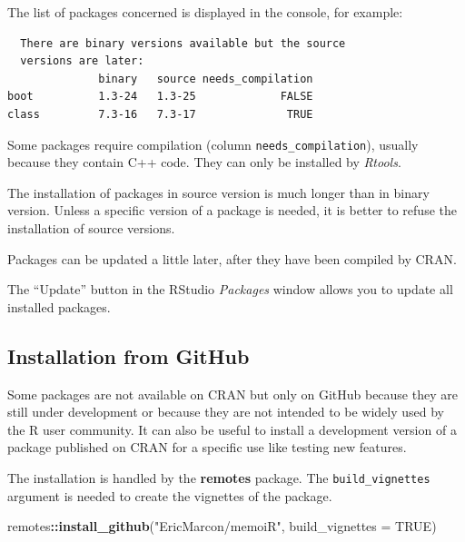 \documentclass[
  12pt,
  american,
  a4paper,
  extrafontsizes,onecolumn,openright
  ]{memoir}
\newenvironment{Shaded}{\begin{snugshade}}{\end{snugshade}}
\newcommand{\AttributeTok}[1]{\textcolor[rgb]{0.13,0.29,0.53}{#1}}
\newcommand{\ConstantTok}[1]{\textcolor[rgb]{0.56,0.35,0.01}{#1}}
\newcommand{\FunctionTok}[1]{\textcolor[rgb]{0.13,0.29,0.53}{\textbf{#1}}}
\newcommand{\NormalTok}[1]{#1}
\newcommand{\SpecialCharTok}[1]{\textcolor[rgb]{0.81,0.36,0.00}{\textbf{#1}}}
\newcommand{\StringTok}[1]{\textcolor[rgb]{0.31,0.60,0.02}{#1}}
\begin{document}
\normalsize

The list of packages concerned is displayed in the console, for example:

\begin{verbatim}
  There are binary versions available but the source 
  versions are later:
              binary   source needs_compilation
boot          1.3-24   1.3-25             FALSE
class         7.3-16   7.3-17              TRUE
\end{verbatim}

Some packages require compilation (column \texttt{needs\_compilation}), usually because they contain C++ code.
They can only be installed by \emph{Rtools}.

The installation of packages in source version is much longer than in binary version.
Unless a specific version of a package is needed, it is better to refuse the installation of source versions.

Packages can be updated a little later, after they have been compiled by CRAN.

The \enquote{Update} button in the RStudio \emph{Packages} window allows you to update all installed packages.

\subsection{Installation from GitHub}\label{installation-from-github}

Some packages are not available on CRAN but only on GitHub because they are still under development or because they are not intended to be widely used by the R user community.
It can also be useful to install a development version of a package published on CRAN for a specific use like testing new features.

The installation is handled by the \textbf{remotes} package.
The \texttt{build\_vignettes} argument is needed to create the vignettes of the package.

\scriptsize

\begin{Shaded}
\begin{Highlighting}[]
\NormalTok{remotes}\SpecialCharTok{::}\FunctionTok{install\_github}\NormalTok{(}\StringTok{"EricMarcon/memoiR"}\NormalTok{, }\AttributeTok{build\_vignettes =} \ConstantTok{TRUE}\NormalTok{)}
\end{Highlighting}
\end{Shaded}

\normalsize
\end{document}
